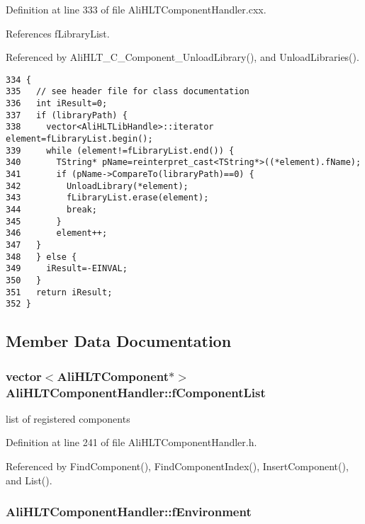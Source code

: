 Definition at line 333 of file Ali\-HLTComponent\-Handler.cxx.

References f\-Library\-List.

Referenced by Ali\-HLT\_\-C\_\-Component\_\-Unload\-Library(), and Unload\-Libraries().

\footnotesize\begin{verbatim}334 {
335   // see header file for class documentation
336   int iResult=0;
337   if (libraryPath) {
338     vector<AliHLTLibHandle>::iterator element=fLibraryList.begin();
339     while (element!=fLibraryList.end()) {
340       TString* pName=reinterpret_cast<TString*>((*element).fName);
341       if (pName->CompareTo(libraryPath)==0) {
342         UnloadLibrary(*element);
343         fLibraryList.erase(element);
344         break;
345       }
346       element++;
347   }
348   } else {
349     iResult=-EINVAL;
350   }
351   return iResult;
352 }
\end{verbatim}\normalsize 




\subsection{Member Data Documentation}
\subsubsection{\setlength{\rightskip}{0pt plus 5cm}vector$<${\bf Ali\-HLTComponent}$\ast$$>$ {\bf Ali\-HLTComponent\-Handler::f\-Component\-List}\hspace{0.3cm}{\tt  [private]}}\label{classAliHLTComponentHandler_r0}


list of registered components 

Definition at line 241 of file Ali\-HLTComponent\-Handler.h.

Referenced by Find\-Component(), Find\-Component\-Index(), Insert\-Component(), and List().
\subsubsection{ {\bf Ali\-HLTComponent\-Handler::f\-Environment}\hspace{0.3cm}{\tt  [private]}}\label{classAliHLTComponentHandler_r3}


